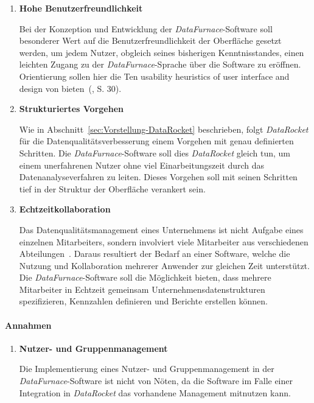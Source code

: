 \documentclass[
  language=german, %
  type=bachelor,%
  ngerman
]{isthesis}
\begin{document}
\begin{content}
\begin{enumerate}
    \item \textbf{Hohe Benutzerfreundlichkeit}

			Bei der Konzeption und Entwicklung der \textit{DataFurnace}-Software soll
			besonderer Wert auf die Benutzerfreundlichkeit der Oberfläche gesetzt
			werden, um jedem Nutzer, obgleich seines bisherigen Kenntnisstandes,
			einen leichten Zugang zu der \textit{DataFurnace}-Sprache über die
			Software zu eröffnen. Orientierung sollen hier die \glqq{}Ten usability
			heuristics of user interface and design\grqq{} von
			\textsc{\citeauthor{nielsen1994heuristic}}
			bieten~(\citeyear{nielsen1994heuristic}, S. 30).

    \item \textbf{Strukturiertes Vorgehen}

      Wie in Abschnitt~\ref{sec:Vorstellung-DataRocket} beschrieben, folgt
      \textit{DataRocket} für die Datenqualitätsverbesserung einem Vorgehen mit
      genau definierten Schritten. Die \textit{DataFurnace}-Software soll dies
      \textit{DataRocket} gleich tun, um einem unerfahrenen Nutzer ohne viel
      Einarbeitungszeit durch das Datenanalyseverfahren zu leiten.  Dieses
      Vorgehen soll mit seinen Schritten tief in der Struktur der Oberfläche
      verankert sein.

    \item \textbf{Echtzeitkollaboration}

			Das Datenqualitätsmanagement eines Unternehmens ist nicht Aufgabe eines
			einzelnen Mitarbeiters, sondern involviert viele Mitarbeiter aus
			verschiedenen Abteilungen~\cite[][S. 2]{geiger2004data}. Daraus resultiert der
			Bedarf an einer Software, welche die Nutzung und Kollaboration mehrerer
			Anwender zur gleichen Zeit unterstützt. Die \textit{DataFurnace}-Software
			soll die Möglichkeit bieten, dass mehrere Mitarbeiter in Echtzeit gemeinsam
			Unternehmensdatenstrukturen spezifizieren, Kennzahlen
			definieren und Berichte erstellen können.
      
  \end{enumerate}


	\paragraph{Annahmen} 
  \begin{enumerate}
    \item \textbf{Nutzer- und Gruppenmanagement}

		Die Implementierung eines Nutzer- und Gruppenmanagement in der
		\textit{DataFurnace}-Software ist nicht von Nöten, da die Software im
		Falle einer Integration in \textit{DataRocket} das vorhandene Management
		mitnutzen kann.


\end{enumerate}
\end{content}
\end{document}
